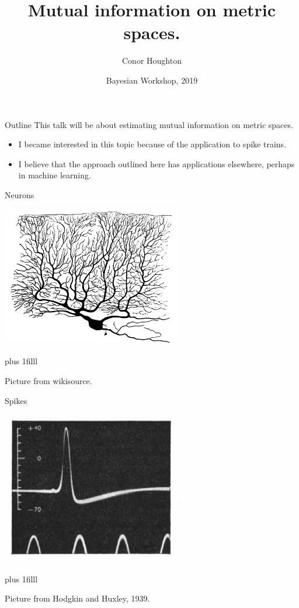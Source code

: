 \documentclass{beamer}
\title[A Kozachenko-Leonenko estimator.]{Mutual information on metric spaces.}
\author{Conor Houghton}
\institute{CS, U Bristol}
\date{Bayesian Workshop, 2019}
\newcommand{\btVFill}{\vskip0pt plus 1filll}
\begin{document}
\maketitle

\begin{frame}{Outline}
This talk will be about estimating mutual information on metric spaces.
\begin{itemize}
\item I became interested in this topic because of the application to spike trains.
\item I believe that the approach outlined here has applications elsewhere, perhaps in machine learning.
\end{itemize}
\color{black}
\end{frame}

\begin{frame}{Neurons}
\color{reddish}
\begin{center}
\includegraphics[width=8cm]{PC.png}
\end{center}
\btVFill
\begin{flushright}
\tiny{Picture from wikisource.}
\end{flushright}
\end{frame}

\begin{frame}{Spikes}
\color{reddish}
\begin{center}
\includegraphics[width=8cm]{spike.png}
\end{center}
\btVFill
\begin{flushright}
\tiny{Picture from Hodgkin and Huxley, 1939.}
\end{flushright}
\end{frame}
\end{document}

